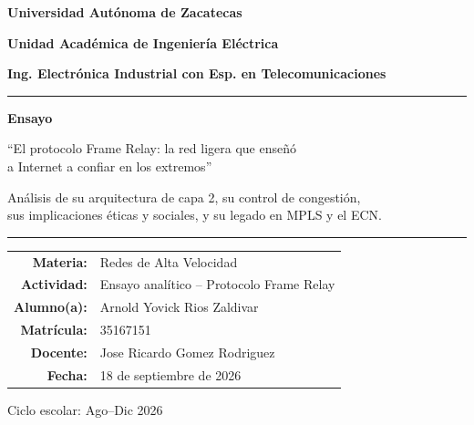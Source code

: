 \documentclass[12pt,a4paper]{article}
\begin{document}
\begin{titlepage}
    \centering
    \vspace*{1cm}
    {\Large\bfseries Universidad Autónoma de Zacatecas\par}
    \vspace{0.4cm}
    {\large\bfseries Unidad Académica de Ingeniería Eléctrica\par}
    {\large\bfseries Ing. Electrónica Industrial con Esp. en Telecomunicaciones\par}
    \vspace{1.5cm}
    \noindent\rule{\textwidth}{0.8pt}
    \vspace{1cm}
    {\huge\bfseries Ensayo\par}
    \vspace{0.7cm}
    {\Large ``El protocolo Frame Relay: la red ligera que enseñó \\ a Internet a confiar en los extremos''\par}
    \vspace{0.6cm}
    {\normalsize Análisis de su arquitectura de capa 2, su control de congestión, \\ sus implicaciones éticas y sociales, y su legado en MPLS y el ECN.\par}
    \vspace{1cm}
    \noindent\rule{\textwidth}{0.8pt}
    \vspace{1.8cm}

    \begin{tabular}{r l}
        \textbf{Materia:}    & Redes de Alta Velocidad \\[0.35cm]
        \textbf{Actividad:}  & Ensayo analítico -- Protocolo Frame Relay \\[0.35cm]
        \textbf{Alumno(a):}  & Arnold Yovick Rios Zaldivar \\[0.35cm]
        \textbf{Matrícula:}  & 35167151 \\[0.35cm]
        \textbf{Docente:}    & Jose Ricardo Gomez Rodriguez \\[0.35cm]
        \textbf{Fecha:}      & 18 de septiembre de 2026
    \end{tabular}

    \vfill
    Ciclo escolar: Ago--Dic 2026
    \vspace*{0.5cm}
\end{titlepage}
\setcounter{page}{1}

\end{document}
